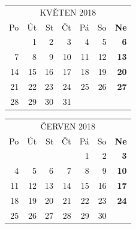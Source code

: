 \documentclass{article}
\begin{document}
\selectfont
\def\arraystretch{1.75}
\tabcolsep=10pt
\begin{tabular}{*6{r}>{\bfseries}r}
\multicolumn{7}{c}{KVĚTEN 2018}\\
\rowcolor[gray]{.75} Po & Út & St & Čt & Pá & So & Ne \\
\hline
                        & 1  & 2  & 3  & 4  & 5  & 6  \\
                     7  & 8  & 9  & 10 & 11 & 12 & 13 \\
                     14 & 15 & 16 & 17 & 18 & 19 & 20 \\
                     21 & 22 & 23 & 24 & 25 & 26 & 27 \\
                     28 & 29 & 30 & 31 &    &    &    \\
\end{tabular}

\newpage
\begin{table}[t!]
\centering
{}
\end{table}

\selectfont
\def\arraystretch{1.75}
\tabcolsep=10pt
\begin{tabular}{*6{r}>{\bfseries}r}
\multicolumn{7}{c}{ČERVEN 2018}\\
\rowcolor[gray]{.75} Po & Út & St & Čt & Pá & So & Ne \\
\hline
                        &    &    &    & 1  & 2  & 3  \\
                     4  & 5  & 6  & 7  & 8  & 9  & 10 \\
                     11 & 12 & 13 & 14 & 15 & 16 & 17 \\
                     18 & 19 & 20 & 21 & 22 & 23 & 24 \\
                     25 & 26 & 27 & 28 & 29 & 30 &   \\
\end{tabular}
\end{document}
